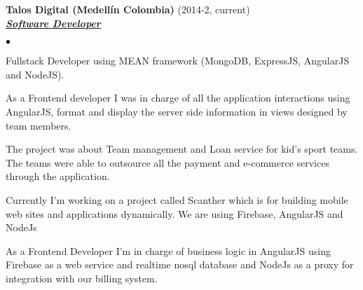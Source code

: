 \documentclass[a4paper]{article}
\newcommand{\employer}[3]{{
\textbf{#1} (#2)\\ \underline{\textbf{\emph{#3}}}\\ }}
\newenvironment{achievements}{\begin{list}{$\bullet$}{\topsep 0pt \itemsep
-2pt}}{\vspace*{4pt}\end{list}}
\begin{document}
\employer{ Talos Digital (Medell\'in Colombia)}{2014-2, current}{Software Developer}
\begin{achievements}
\item Fullstack Developer using MEAN framework  (MongoDB, ExpressJS, AngularJS and NodeJS).
\item As a Frontend developer I was in charge of all the application interactions using AngularJS, format and display the server side information in views designed by team members.
\item The project was about Team management and Loan service for kid's sport teams. The teams were able to outsource all the payment and e-commerce services through the application.
\item Currently I'm working on a project called Scanther which is for building mobile web sites and applications dynamically. We are using Firebase, AngularJS and NodeJs
\item As a Frontend Developer I'm in charge of business logic in AngularJS using Firebase as a web service and realtime nosql database and NodeJs as a proxy for integration with our billing system.
\end{achievements}
\end{document}
